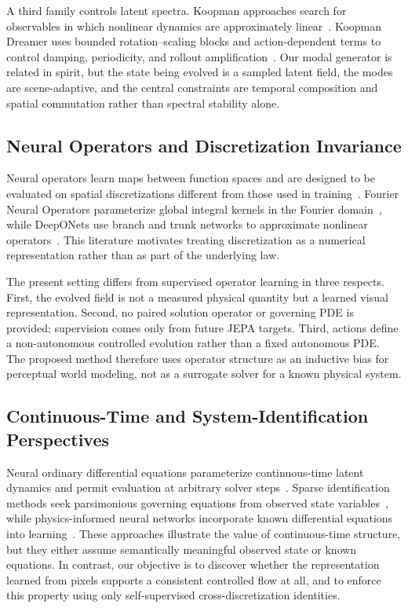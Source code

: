 \documentclass{article}
\theoremstyle{plain}
\theoremstyle{definition}
\theoremstyle{remark}
\begin{document}
A third family controls latent spectra. Koopman approaches search for observables in which nonlinear dynamics are approximately linear~\citep{lusch2018koopman}. Koopman Dreamer uses bounded rotation--scaling blocks and action-dependent terms to control damping, periodicity, and rollout amplification~\citep{li2026koopman}. Our modal generator is related in spirit, but the state being evolved is a sampled latent field, the modes are scene-adaptive, and the central constraints are temporal composition and spatial commutation rather than spectral stability alone.

\subsection{Neural Operators and Discretization Invariance}
Neural operators learn maps between function spaces and are designed to be evaluated on spatial discretizations different from those used in training~\citep{lu2021deeponet,li2021fno,kovachki2023neuraloperator}. Fourier Neural Operators parameterize global integral kernels in the Fourier domain~\citep{li2021fno}, while DeepONets use branch and trunk networks to approximate nonlinear operators~\citep{lu2021deeponet}. This literature motivates treating discretization as a numerical representation rather than as part of the underlying law.

The present setting differs from supervised operator learning in three respects. First, the evolved field is not a measured physical quantity but a learned visual representation. Second, no paired solution operator or governing PDE is provided; supervision comes only from future JEPA targets. Third, actions define a non-autonomous controlled evolution rather than a fixed autonomous PDE. The proposed method therefore uses operator structure as an inductive bias for perceptual world modeling, not as a surrogate solver for a known physical system.

\subsection{Continuous-Time and System-Identification Perspectives}
Neural ordinary differential equations parameterize continuous-time latent dynamics and permit evaluation at arbitrary solver steps~\citep{chen2018neuralode}. Sparse identification methods seek parsimonious governing equations from observed state variables~\citep{brunton2016sindy}, while physics-informed neural networks incorporate known differential equations into learning~\citep{raissi2019pinn}. These approaches illustrate the value of continuous-time structure, but they either assume semantically meaningful observed state or known equations. In contrast, our objective is to discover whether the representation learned from pixels supports a consistent controlled flow at all, and to enforce this property using only self-supervised cross-discretization identities.
\end{document}
